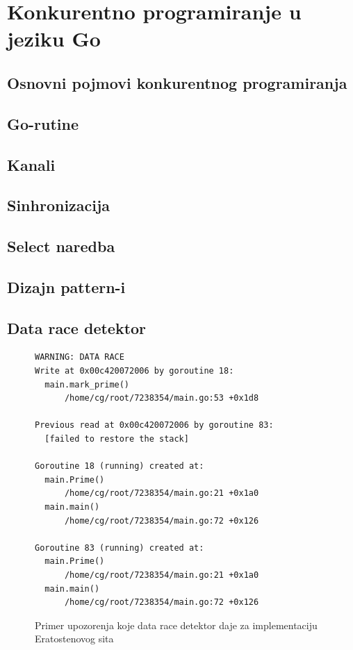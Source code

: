 \documentclass[12pt,oneside]{memoir}
\begin{document}
\chapter{Konkurentno programiranje u jeziku Go}

\section{Osnovni pojmovi konkurentnog programiranja}

\section{Go-rutine}

\section{Kanali} \label{chanel}

\section{Sinhronizacija}

\section{Select naredba}

\section{Dizajn pattern-i}

\section{Data race detektor}

\begin{figure}
\begin{center}

\begin{Verbatim}[fontsize=\small]
WARNING: DATA RACE
Write at 0x00c420072006 by goroutine 18:
  main.mark_prime()
      /home/cg/root/7238354/main.go:53 +0x1d8

Previous read at 0x00c420072006 by goroutine 83:
  [failed to restore the stack]

Goroutine 18 (running) created at:
  main.Prime()
      /home/cg/root/7238354/main.go:21 +0x1a0
  main.main()
      /home/cg/root/7238354/main.go:72 +0x126

Goroutine 83 (running) created at:
  main.Prime()
      /home/cg/root/7238354/main.go:21 +0x1a0
  main.main()
      /home/cg/root/7238354/main.go:72 +0x126
\end{Verbatim}

\caption{Primer upozorenja koje data race detektor daje za implementaciju Eratostenovog sita}
\label{fig:datarace}
\end{center}
\end{figure}
\end{document}
